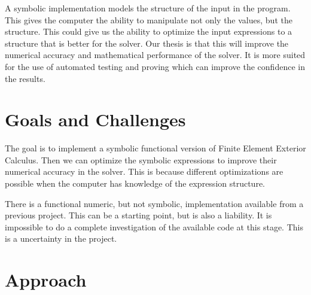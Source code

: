 \documentclass{scrartcl}
\begin{document}
A symbolic implementation models the structure of the input in the program.
This gives the computer the ability to manipulate not only the values, but the
structure. This could give us the ability to optimize the input expressions to
a structure that is better for the solver. Our thesis is that this will improve
the numerical accuracy and mathematical performance of the solver.  It is more
suited for the use of automated testing and proving which can improve the
confidence in the results.




\section{Goals and Challenges}

The goal is to implement a symbolic functional version of Finite
Element Exterior Calculus.  Then we can optimize the symbolic expressions to
improve their numerical accuracy in the solver. This is because
different optimizations are possible when the computer has knowledge
of the expression structure.



There is a functional numeric, but not symbolic, implementation
available from a previous project. This can be a starting point, but
is also a liability.  It is impossible to do a complete investigation
of the available code at this stage.  This is a uncertainty in the
project.


\section{Approach}
\end{document}
